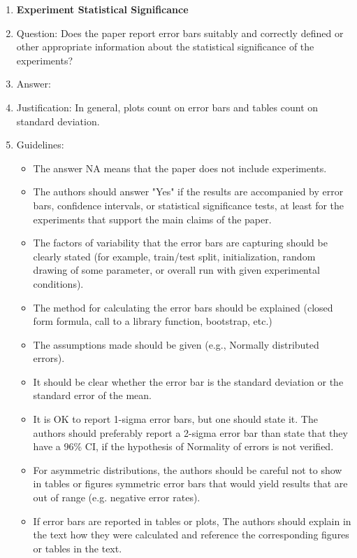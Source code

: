 \documentclass{article}
\theoremstyle{plain}
\theoremstyle{definition}
\theoremstyle{remark}
\theoremstyle{remark}
\begin{document}
\begin{enumerate}
\item {\bf Experiment Statistical Significance}
    \item[] Question: Does the paper report error bars suitably and correctly defined or other appropriate information about the statistical significance of the experiments?
    \item[] Answer: \answerYes{} %
    \item[] Justification: In general, plots count on error bars and tables count on standard deviation.
    \item[] Guidelines:
    \begin{itemize}
        \item The answer NA means that the paper does not include experiments.
        \item The authors should answer "Yes" if the results are accompanied by error bars, confidence intervals, or statistical significance tests, at least for the experiments that support the main claims of the paper.
        \item The factors of variability that the error bars are capturing should be clearly stated (for example, train/test split, initialization, random drawing of some parameter, or overall run with given experimental conditions).
        \item The method for calculating the error bars should be explained (closed form formula, call to a library function, bootstrap, etc.)
        \item The assumptions made should be given (e.g., Normally distributed errors).
        \item It should be clear whether the error bar is the standard deviation or the standard error of the mean.
        \item It is OK to report 1-sigma error bars, but one should state it. The authors should preferably report a 2-sigma error bar than state that they have a 96\% CI, if the hypothesis of Normality of errors is not verified.
        \item For asymmetric distributions, the authors should be careful not to show in tables or figures symmetric error bars that would yield results that are out of range (e.g. negative error rates).
        \item If error bars are reported in tables or plots, The authors should explain in the text how they were calculated and reference the corresponding figures or tables in the text.
    \end{itemize}


\end{enumerate}
\end{document}
